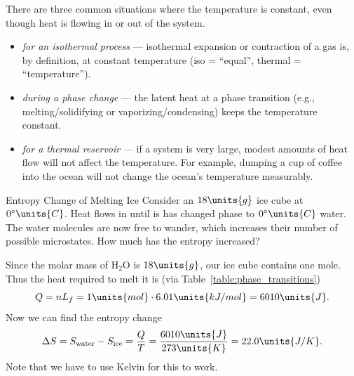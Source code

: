 There are three common situations where the temperature is constant,
even though heat is flowing in or out of the system.
\begin{itemize}
\item {\it for an isothermal process} --- isothermal expansion or
  contraction of a gas is, by definition, at constant temperature (iso
  = ``equal'', thermal = ``temperature'').
\item {\it during a phase change} --- the latent heat at a phase
  transition (e.g., melting/solidifying or vaporizing/condensing)
  keeps the temperature constant.
\item {\it for a thermal reservoir} --- if a system is very large,
  modest amounts of heat flow will not affect the temperature.  For
  example, dumping a cup of coffee into the ocean will not change the
  ocean's temperature measurably.
\end{itemize}

\begin{example}{Entropy Change of Melting Ice}
  Consider an $18\units{g}$ ice cube at $0^\circ\units{C}$.  Heat
  flows in until is has changed phase to $0^\circ\units{C}$ water.
  The water molecules are now free to wander, which increases their
  number of possible microstates.  How much has the entropy increased?

\solution Since the molar mass of H$_2$O is $18\units{g}$, our ice
cube contains one mole.  Thus the heat required to melt it is (via
Table~\ref{table:phase_transitions})
\begin{equation}
Q = n L_f = 1\units{mol} \cdot 6.01\units{kJ/mol} = 6010 \units{J}.
\end{equation}
Now we can find the entropy change
\begin{equation}
\Delta S = S_\text{water} - S_\text{ice}= \frac{Q}{T}=
\frac{6010\units{J}}{273\units{K}}= 22.0 \units{J/K}.
\end{equation}
Note that we have to use Kelvin for this to work.
\end{example}


